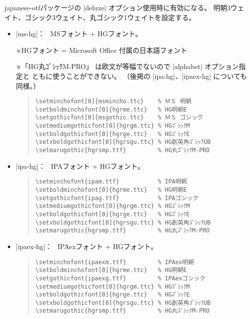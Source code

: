 \documentclass[uplatex,dvipdfmx,a4paper]{jsarticle}
\newcommand{\Pkg}[1]{\textsf{#1}}
\newcommand{\Note}{\par\noindent ※}
\newcommand{\Means}{：\ }
\begin{document}
\Pkg{japanese-otf}パッケージの |deluxe| オプション使用時に有効になる。
明朝3ウェイト、ゴシック3ウェイト、丸ゴシック1ウェイトを設定する。

\begin{itemize}
\item |ms-hg|\Means
  MSフォント + HGフォント。
  \Note HGフォント = Microsoft Office 付属の日本語フォント
  \Note 「HG丸ｺﾞｼｯｸM-PRO」
  は欧文が等幅でないので |alphabet| オプション指定と
  ともに使うことができない。
  （後掲の |ipa-hg|、|ipaex-hg| についても同様。）

\begin{quote}\small\begin{verbatim}
\setminchofont[0]{msmincho.ttc}    % ＭＳ 明朝
\setboldminchofont[0]{hgrme.ttc}   % HG明朝E
\setgothicfont[0]{msgothic.ttc}    % ＭＳ ゴシック
\setmediumgothicfont[0]{hgrgm.ttc} % HGｺﾞｼｯｸM
\setboldgothicfont[0]{hgrge.ttc}   % HGｺﾞｼｯｸE
\setxboldgothicfont[0]{hgrsgu.ttc} % HG創英角ｺﾞｼｯｸUB
\setmarugothic{hgrsmp.ttf}         % HG丸ｺﾞｼｯｸM-PRO 
\end{verbatim}\end{quote}

\item |ipa-hg|\Means
   IPAフォント + HGフォント。
\begin{quote}\small\begin{verbatim}
\setminchofont{ipam.ttf}           % IPA明朝
\setboldminchofont[0]{hgrme.ttc}   % HG明朝E
\setgothicfont{ipag.ttf}           % IPAゴシック
\setmediumgothicfont[0]{hgrgm.ttc} % HGｺﾞｼｯｸM
\setboldgothicfont[0]{hgrge.ttc}   % HGｺﾞｼｯｸE
\setxboldgothicfont[0]{hgrsgu.ttc} % HG創英角ｺﾞｼｯｸUB
\setmarugothic{hgrsmp.ttf}         % HG丸ｺﾞｼｯｸM-PRO 
\end{verbatim}\end{quote}

\item |ipaex-hg|\Means
   IPAexフォント + HGフォント。
\begin{quote}\small\begin{verbatim}
\setminchofont{ipaexm.ttf}         % IPAex明朝
\setboldminchofont[0]{hgrme.ttc}   % HG明朝E
\setgothicfont{ipaexg.ttf}         % IPAexゴシック
\setmediumgothicfont[0]{hgrgm.ttc} % HGｺﾞｼｯｸM
\setboldgothicfont[0]{hgrge.ttc}   % HGｺﾞｼｯｸE
\setxboldgothicfont[0]{hgrsgu.ttc} % HG創英角ｺﾞｼｯｸUB
\setmarugothic{hgrsmp.ttf}         % HG丸ｺﾞｼｯｸM-PRO 
\end{verbatim}\end{quote}


\end{itemize}
\end{document}
